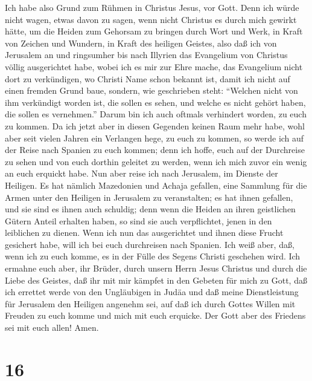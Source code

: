  Ich habe also Grund zum Rühmen in Christus Jesus, vor
Gott.  Denn ich würde nicht wagen, etwas davon zu sagen,
wenn nicht Christus es durch mich gewirkt hätte, um die Heiden zum
Gehorsam zu bringen durch Wort und Werk,  in Kraft von
Zeichen und Wundern, in Kraft des heiligen Geistes, also daß ich von
Jerusalem an und ringsumher bis nach Illyrien das Evangelium von
Christus völlig ausgerichtet habe,  wobei ich es mir zur
Ehre mache, das Evangelium nicht dort zu verkündigen, wo Christi Name
schon bekannt ist, damit ich nicht auf einen fremden Grund baue,
 sondern, wie geschrieben steht: ``Welchen nicht von ihm
verkündigt worden ist, die sollen es sehen, und welche es nicht gehört
haben, die sollen es vernehmen.''  Darum bin ich auch
oftmals verhindert worden, zu euch zu kommen.  Da ich
jetzt aber in diesen Gegenden keinen Raum mehr habe, wohl aber seit
vielen Jahren ein Verlangen hege, zu euch zu kommen,  so
werde ich auf der Reise nach Spanien zu euch kommen; denn ich hoffe,
euch auf der Durchreise zu sehen und von euch dorthin geleitet zu
werden, wenn ich mich zuvor ein wenig an euch erquickt habe.
 Nun aber reise ich nach Jerusalem, im Dienste der
Heiligen.  Es hat nämlich Mazedonien und Achaja gefallen,
eine Sammlung für die Armen unter den Heiligen in Jerusalem zu
veranstalten;  es hat ihnen gefallen, und sie sind es
ihnen auch schuldig; denn wenn die Heiden an ihren geistlichen Gütern
Anteil erhalten haben, so sind sie auch verpflichtet, jenen in den
leiblichen zu dienen.  Wenn ich nun das ausgerichtet und
ihnen diese Frucht gesichert habe, will ich bei euch durchreisen nach
Spanien.  Ich weiß aber, daß, wenn ich zu euch komme, es
in der Fülle des Segens Christi geschehen wird.  Ich
ermahne euch aber, ihr Brüder, durch unsern Herrn Jesus Christus und
durch die Liebe des Geistes, daß ihr mit mir kämpfet in den Gebeten für
mich zu Gott,  daß ich errettet werde von den Ungläubigen
in Judäa und daß meine Dienstleistung für Jerusalem den Heiligen
angenehm sei,  auf daß ich durch Gottes Willen mit
Freuden zu euch komme und mich mit euch erquicke.  Der
Gott aber des Friedens sei mit euch allen! Amen.

\hypertarget{section-15}{%
\section{16}\label{section-15}}

